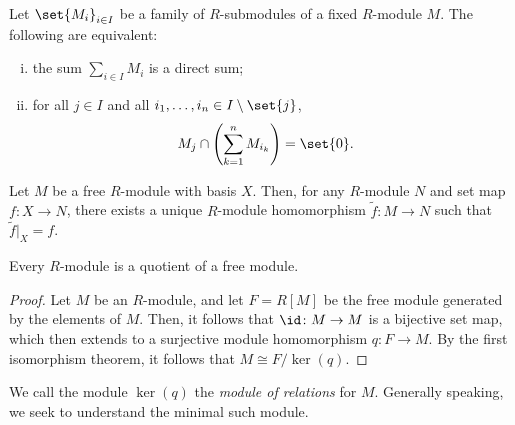 \documentclass[10pt]{mypackage}
\begin{document}
\begin{proposition}
  Let $\set{M_i}_{i\in I}$ be a family of $R$-submodules of a fixed $R$-module $M$. The following are equivalent:
  \begin{enumerate}[(i)]
    \item the sum $\sum_{i\in I}M_i$ is a direct sum;
    \item for all $j\in I$ and all $i_1,\dots,i_n\in I\setminus \set{j}$,
      \begin{align*}
        M_j\cap \left( \sum_{k=1}^{n}M_{i_k} \right) &= \set{0}.
      \end{align*}
  \end{enumerate}
\end{proposition}
\begin{theorem}
  Let $M$ be a free $R$-module with basis $X$. Then, for any $R$-module $N$ and set map $f\colon X\rightarrow N$, there exists a unique $R$-module homomorphism $ \widetilde{f}\colon M\rightarrow N $ such that $\widetilde{f}|_{X} = f$.
  \begin{center}
  \end{center}
\end{theorem}
\begin{corollary}
  Every $R$-module is a quotient of a free module.
\end{corollary}
\begin{proof}
  Let $M$ be an $R$-module, and let $F = R[M]$ be the free module generated by the elements of $M$. Then, it follows that $\id\colon M\rightarrow M$ is a bijective set map, which then extends to a surjective module homomorphism $q\colon F\rightarrow M$. By the first isomorphism theorem, it follows that $M\cong F/\ker\left( q \right)$. 
\end{proof}
\begin{definition}
  We call the module $\ker\left( q \right)$ the \textit{module of relations} for $M$. Generally speaking, we seek to understand the minimal such module.
\end{definition}
\end{document}
